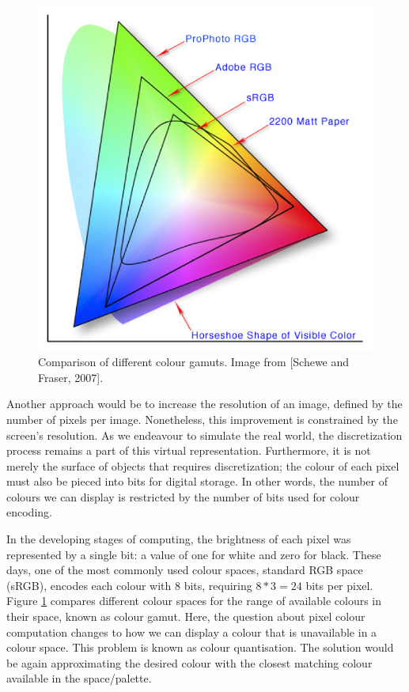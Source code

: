\begin{figure}
\includegraphics[width=0.9\linewidth]{Images/colourspace.png}
\caption{Comparison of different colour gamuts. Image from [Schewe and Fraser, 2007].}\label{fig:colour-gamut}
    
\end{figure} 

Another approach would be to increase the resolution of an image, defined by the number of pixels per image. Nonetheless, this improvement is constrained by the screen’s resolution. As we endeavour to simulate the real world, the discretization process remains a part of this virtual representation. Furthermore, it is not merely the surface of objects that requires discretization; the colour of each pixel must also be pieced into bits for digital storage. In other words, the number of colours we can display is restricted by the number of bits used for colour encoding. 

In the developing stages of computing, the brightness of each pixel was represented by a single bit: a value of one for white and zero for black. These days, one of the most commonly used colour spaces, standard RGB space (sRGB), encodes each colour with 8 bits, requiring $8 * 3 = 24$ bits per pixel. Figure \ref{fig:colour-gamut} compares different colour spaces for the range of available colours in their space, known as colour gamut. Here, the question about pixel colour computation changes to how we can display a colour that is unavailable in a colour space. This problem is known as colour quantisation. The solution would be again approximating the desired colour with the closest matching colour available in the space/palette.

